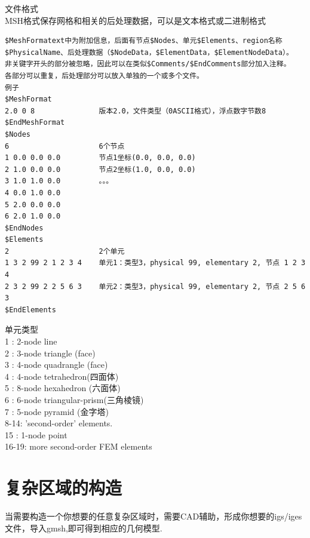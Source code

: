 \documentclass[12pt]{article}
\begin{document}
\begin{CJK}{UTF8}{gkai}
文件格式\\

MSH格式保存网格和相关的后处理数据，可以是文本格式或二进制格式\\
\begin{verbatim}
$MeshFormatext中为附加信息，后面有节点$Nodes、单元$Elements、region名称$PhysicalName、后处理数据（$NodeData，$ElementData，$ElementNodeData）。
非关键字开头的部分被忽略，因此可以在类似$Comments/$EndComments部分加入注释。
各部分可以重复，后处理部分可以放入单独的一个或多个文件。
例子
$MeshFormat
2.0 0 8               版本2.0，文件类型（0ASCII格式），浮点数字节数8
$EndMeshFormat
$Nodes
6                     6个节点
1 0.0 0.0 0.0         节点1坐标(0.0, 0.0, 0.0)
2 1.0 0.0 0.0         节点2坐标(1.0, 0.0, 0.0)
3 1.0 1.0 0.0         。。。
4 0.0 1.0 0.0
5 2.0 0.0 0.0
6 2.0 1.0 0.0
$EndNodes
$Elements
2                     2个单元
1 3 2 99 2 1 2 3 4    单元1：类型3，physical 99, elementary 2, 节点 1 2 3 4
2 3 2 99 2 2 5 6 3    单元2：类型3，physical 99, elementary 2, 节点 2 5 6 3
$EndElements
\end{verbatim}
单元类型\\

1 : 2-node line \\ 

2 : 3-node triangle (face) \\ 

3 : 4-node quadrangle (face)\\  

4 : 4-node tetrahedron(四面体)\\

5 : 8-node hexahedron (六面体) \\ 
  
6 : 6-node triangular-prism(三角棱镜) \\ 
  
7 : 5-node pyramid (金字塔) \\
   
  
8-14: 'second-order' elements.\\  
  
15 : 1-node point \\
  
16-19: more second-order FEM elements\\
\section{复杂区域的构造}

当需要构造一个你想要的任意复杂区域时，需要CAD辅助，形成你想要的igs/iges文件，导入gmsh,即可得到相应的几何模型.\\


    
    
   
    
    
\end{CJK}
\end{document}
